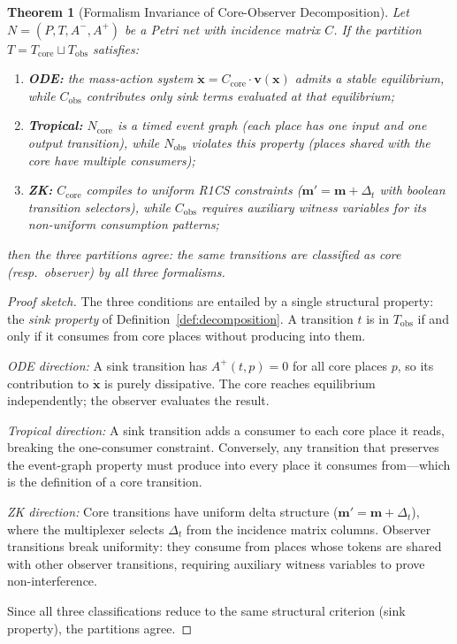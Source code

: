 \documentclass[11pt,a4paper]{article}
\newtheorem{theorem}{Theorem}
\begin{document}
\begin{theorem}[Formalism Invariance of Core-Observer Decomposition]
\label{thm:invariance}
Let $N = (P, T, A^-, A^+)$ be a Petri net with incidence matrix $C$.
If the partition $T = T_{\mathrm{core}} \sqcup T_{\mathrm{obs}}$ satisfies:
\begin{enumerate}
  \item \textbf{ODE:} the mass-action system $\dot{\mathbf{x}} = C_{\mathrm{core}} \cdot \mathbf{v}(\mathbf{x})$ admits a stable equilibrium, while $C_{\mathrm{obs}}$ contributes only sink terms evaluated at that equilibrium;
  \item \textbf{Tropical:} $N_{\mathrm{core}}$ is a timed event graph (each place has one input and one output transition), while $N_{\mathrm{obs}}$ violates this property (places shared with the core have multiple consumers);
  \item \textbf{ZK:} $C_{\mathrm{core}}$ compiles to uniform R1CS constraints ($\mathbf{m}' = \mathbf{m} + \Delta_t$ with boolean transition selectors), while $C_{\mathrm{obs}}$ requires auxiliary witness variables for its non-uniform consumption patterns;
\end{enumerate}
then the three partitions agree: the same transitions are classified as core (resp.\ observer) by all three formalisms.
\end{theorem}

\begin{proof}[Proof sketch]
The three conditions are entailed by a single structural property: the \emph{sink property} of Definition~\ref{def:decomposition}.
A transition $t$ is in $T_{\mathrm{obs}}$ if and only if it consumes from core places without producing into them.

\emph{ODE direction:} A sink transition has $A^+(t, p) = 0$ for all core places $p$, so its contribution to $\dot{\mathbf{x}}$ is purely dissipative.  The core reaches equilibrium independently; the observer evaluates the result.

\emph{Tropical direction:} A sink transition adds a consumer to each core place it reads, breaking the one-consumer constraint.  Conversely, any transition that preserves the event-graph property must produce into every place it consumes from---which is the definition of a core transition.

\emph{ZK direction:} Core transitions have uniform delta structure ($\mathbf{m}' = \mathbf{m} + \Delta_t$), where the multiplexer selects $\Delta_t$ from the incidence matrix columns.  Observer transitions break uniformity: they consume from places whose tokens are shared with other observer transitions, requiring auxiliary witness variables to prove non-interference.

Since all three classifications reduce to the same structural criterion (sink property), the partitions agree.
\end{proof}
\end{document}
